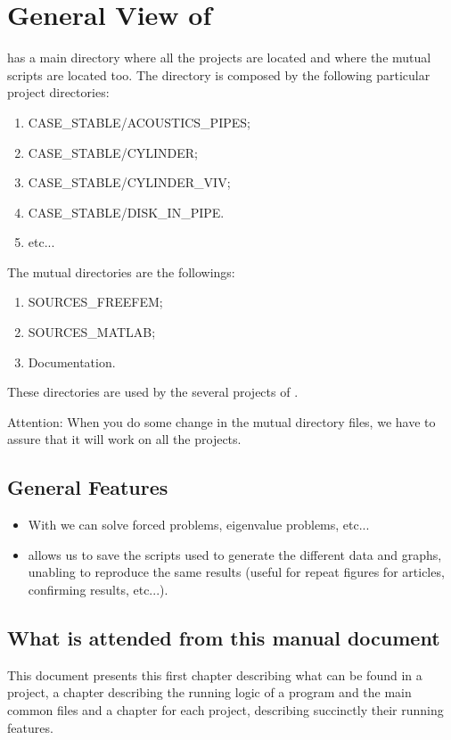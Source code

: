 \chapter{General View of }



 has a main directory where all the projects are located and where the mutual scripts are located too. The directory is composed by the following particular project directories:


\begin{enumerate}
\item CASE\_STABLE/ACOUSTICS\_PIPES;
\item CASE\_STABLE/CYLINDER;
\item CASE\_STABLE/CYLINDER\_VIV;
\item CASE\_STABLE/DISK\_IN\_PIPE.
\item etc...
\end{enumerate}
The mutual directories are the followings:

\begin{enumerate}
\item SOURCES\_FREEFEM;
\item SOURCES\_MATLAB;
\item Documentation.
\end{enumerate}

These directories are used by the several projects of .

\medskip

\begin{leftbar}
Attention: When you do some change in the mutual directory files, we have to assure that it will work on all the projects.
\end{leftbar}
\section{General Features}

\begin{itemize}
\item With  we can solve forced problems, eigenvalue problems, etc...

\item  {} allows us to save the scripts used to generate the different data and graphs, unabling to reproduce the same results (useful for repeat figures for articles, confirming results, etc...).
\end{itemize}



\section{What is attended from this manual document}
This document presents this first chapter describing what can be found in a   project, a chapter describing the running logic of a  program and the main common files and a chapter for each project, describing succinctly their running features.
